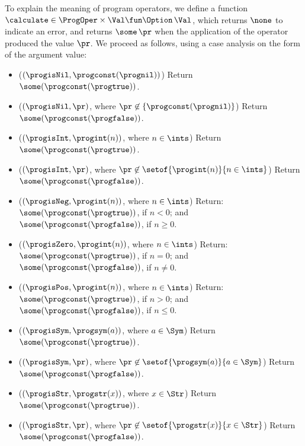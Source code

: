 To explain the meaning of program operators, we define a function
$\calculate\in\ProgOper\times\Val\fun\Option\,\Val$, which returns
$\none$ to indicate an error, and returns $\some\,\pr$ when the
application of the operator produced the value $\pr$.  We proceed
as follows, using a case analysis on the form of the argument
value:
\begin{itemize}
\item ($(\progisNil, \progconst(\prognil))$)
  Return $\some(\progconst(\progtrue))$.

\item ($(\progisNil, \pr)$, where $\pr\not\in\{\progconst(\prognil)\}$)
  Return $\some(\progconst(\progfalse))$.

\item ($(\progisInt, \progint(n))$, where $n\in\ints$)
  Return $\some(\progconst(\progtrue))$.

\item ($(\progisInt, \pr)$, where $\pr\not\in\setof{\progint(n)}{n\in\ints}$)
  Return $\some(\progconst(\progfalse))$.

\item ($(\progisNeg, \progint(n))$, where $n\in\ints$)
  Return: $\some(\progconst(\progtrue))$, if $n < 0$;
  and $\some(\progconst(\progfalse))$, if $n\geq 0$.

\item ($(\progisZero, \progint(n))$, where $n\in\ints$)
  Return: $\some(\progconst(\progtrue))$, if $n = 0$;
  and $\some(\progconst(\progfalse))$, if $n\neq 0$.

\item ($(\progisPos, \progint(n))$, where $n\in\ints$)
  Return: $\some(\progconst(\progtrue))$, if $n > 0$;
  and $\some(\progconst(\progfalse))$, if $n\leq 0$.

\item ($(\progisSym, \progsym(a))$, where $a\in\Sym$)
  Return $\some(\progconst(\progtrue))$.

\item ($(\progisSym, \pr)$, where $\pr\not\in\setof{\progsym(a)}{a\in\Sym}$)
   Return $\some(\progconst(\progfalse))$.

\item ($(\progisStr, \progstr(x))$, where $x\in\Str$)
  Return $\some(\progconst(\progtrue))$.

\item ($(\progisStr, \pr)$, where $\pr\not\in\setof{\progstr(x)}{x\in\Str}$)
   Return $\some(\progconst(\progfalse))$.


\end{itemize}
